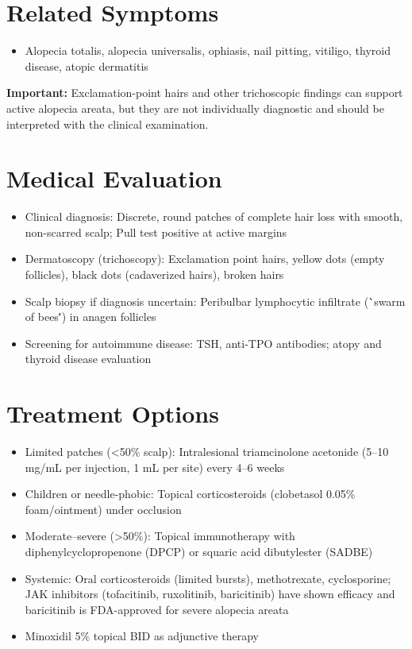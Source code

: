 \section*{Related Symptoms}
\begin{itemize}
 \item Alopecia totalis, alopecia universalis, ophiasis, nail pitting, vitiligo, thyroid disease, atopic dermatitis
\end{itemize}
\textbf{Important:} Exclamation-point hairs and other trichoscopic findings can support active alopecia areata, but they are not individually diagnostic and should be interpreted with the clinical examination.

\section*{Medical Evaluation}
\begin{itemize}
 \item Clinical diagnosis: Discrete, round patches of complete hair loss with smooth, non-scarred scalp; Pull test positive at active margins
 \item Dermatoscopy (trichoscopy): Exclamation point hairs, yellow dots (empty follicles), black dots (cadaverized hairs), broken hairs
 \item Scalp biopsy if diagnosis uncertain: Peribulbar lymphocytic infiltrate (\``swarm of bees\'') in anagen follicles
 \item Screening for autoimmune disease: TSH, anti-TPO antibodies; atopy and thyroid disease evaluation
\end{itemize}

\section*{Treatment Options}
\begin{itemize}
 \item Limited patches (<50\% scalp): Intralesional triamcinolone acetonide (5--10 mg/mL per injection, 1 mL per site) every 4--6 weeks
 \item Children or needle-phobic: Topical corticosteroids (clobetasol 0.05\% foam/ointment) under occlusion
 \item Moderate--severe (>50\%): Topical immunotherapy with diphenylcyclopropenone (DPCP) or squaric acid dibutylester (SADBE)
 \item Systemic: Oral corticosteroids (limited bursts), methotrexate, cyclosporine; JAK inhibitors (tofacitinib, ruxolitinib, baricitinib) have shown efficacy and baricitinib is FDA-approved for severe alopecia areata
 \item Minoxidil 5\% topical BID as adjunctive therapy
\end{itemize}

